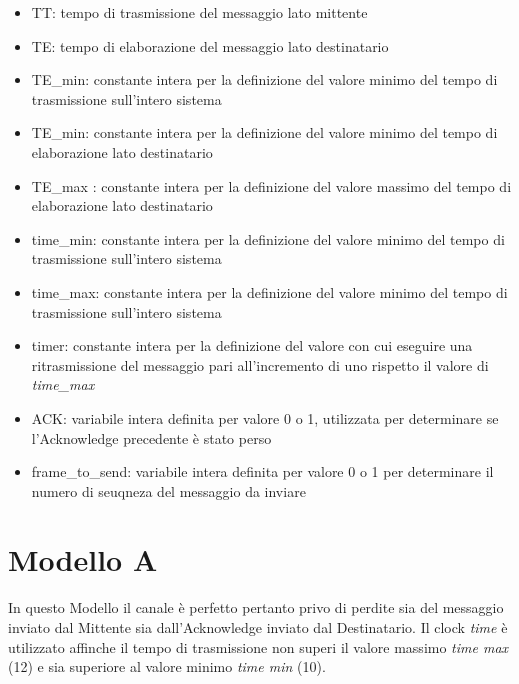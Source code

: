 \documentclass{article}
\begin{document}
\begin{itemize}
    \item TT: tempo di trasmissione del messaggio lato mittente
    \item TE: tempo di elaborazione del messaggio lato destinatario
    \item TE\_min: constante intera per la definizione del valore minimo del tempo di trasmissione sull'intero sistema
    \item TE\_min: constante intera per la definizione del valore minimo del tempo di elaborazione lato destinatario
    \item TE\_max : constante intera per la definizione del valore massimo del tempo di elaborazione lato destinatario
    \item time\_min: constante intera per la definizione del valore minimo del tempo di trasmissione sull'intero sistema
    \item time\_max: constante intera per la definizione del valore minimo del tempo di trasmissione sull'intero sistema
    \item timer: constante intera per la definizione del valore con cui eseguire una ritrasmissione del messaggio pari all'incremento di uno rispetto il valore di \textit{time\_max}
    \item ACK: variabile intera definita per valore 0 o 1, utilizzata per determinare se l'Acknowledge precedente è stato perso
    \item frame\_to\_send: variabile intera definita per valore 0 o 1 per determinare il numero di seuqneza del messaggio da inviare 
\end{itemize}
\clearpage
\section{Modello A}
In questo Modello il canale è perfetto pertanto privo di perdite sia del messaggio inviato dal Mittente sia dall'Acknowledge inviato dal Destinatario. Il clock \textit{time} è utilizzato affinche il tempo di trasmissione non superi il valore massimo \textit{time max} (12) e sia superiore al valore minimo \textit{time min} (10).
\end{document}
